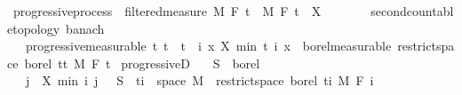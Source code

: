 \begin{isabellebody}
\endisatagproof
{\isafoldproof}%
%
\isadelimproof
%
\endisadelimproof
%
\isadelimdocument
%
\endisadelimdocument
%
\isatagdocument
%
\isamarkuptrue%
%
\endisatagdocument
{\isafolddocument}%
%
\isadelimdocument
%
\endisadelimdocument
{}\isamarkupfalse%
\ progressive{\isacharunderscore}{\kern0pt}process\ {\isacharequal}{\kern0pt}\ filtered{\isacharunderscore}{\kern0pt}measure\ M\ F\ t\ \ M\ F\ t\ \ X\ {\isacharcolon}{\kern0pt}{\isacharcolon}{\kern0pt}\ {\isachardoublequoteopen}{\isacharunderscore}{\kern0pt}\ {\isasymRightarrow}\ {\isacharunderscore}{\kern0pt}\ {\isasymRightarrow}\ {\isacharunderscore}{\kern0pt}\ {\isacharcolon}{\kern0pt}{\isacharcolon}{\kern0pt}\ {\isacharbraceleft}{\kern0pt}second{\isacharunderscore}{\kern0pt}countable{\isacharunderscore}{\kern0pt}topology{\isacharcomma}{\kern0pt}\ banach{\isacharbraceright}{\kern0pt}{\isachardoublequoteclose}\ {\isacharplus}{\kern0pt}\isanewline
\ \ \ progressive{\isacharbrackleft}{\kern0pt}measurable{\isacharbrackright}{\kern0pt}{\isacharcolon}{\kern0pt}\ {\isachardoublequoteopen}{\isasymAnd}t{\isachardot}{\kern0pt}\ t\ {\isasymle}\ t\ {\isasymLongrightarrow}\ {\isacharparenleft}{\kern0pt}{\isasymlambda}{\isacharparenleft}{\kern0pt}i{\isacharcomma}{\kern0pt}\ x{\isacharparenright}{\kern0pt}{\isachardot}{\kern0pt}\ X\ {\isacharparenleft}{\kern0pt}min\ t\ i{\isacharparenright}{\kern0pt}\ x{\isacharparenright}{\kern0pt}\ {\isasymin}\ borel{\isacharunderscore}{\kern0pt}measurable\ {\isacharparenleft}{\kern0pt}restrict{\isacharunderscore}{\kern0pt}space\ borel\ {\isacharbraceleft}{\kern0pt}tt{\isacharbraceright}{\kern0pt}\ {\isasymOtimes}\isactrlsub M\ F\ t{\isacharparenright}{\kern0pt}{\isachardoublequoteclose}\isanewline
{}\isanewline
\isanewline
{}\isamarkupfalse%
\ progressiveD{\isacharcolon}{\kern0pt}\isanewline
\ \ \ {\isachardoublequoteopen}S\ {\isasymin}\ borel{\isachardoublequoteclose}\isanewline
\ \ \ {\isachardoublequoteopen}{\isacharparenleft}{\kern0pt}{\isasymlambda}{\isacharparenleft}{\kern0pt}j{\isacharcomma}{\kern0pt}\ {\isasymxi}{\isacharparenright}{\kern0pt}{\isachardot}{\kern0pt}\ X\ {\isacharparenleft}{\kern0pt}min\ i\ j{\isacharparenright}{\kern0pt}\ {\isasymxi}{\isacharparenright}{\kern0pt}\ {\isacharminus}{\kern0pt}{\isacharbackquote}{\kern0pt}\ S\ {\isasyminter}\ {\isacharparenleft}{\kern0pt}{\isacharbraceleft}{\kern0pt}ti{\isacharbraceright}{\kern0pt}\ {\isasymtimes}\ space\ M{\isacharparenright}{\kern0pt}\ {\isasymin}\ {\isacharparenleft}{\kern0pt}restrict{\isacharunderscore}{\kern0pt}space\ borel\ {\isacharbraceleft}{\kern0pt}ti{\isacharbraceright}{\kern0pt}\ {\isasymOtimes}\isactrlsub M\ F\ i{\isacharparenright}{\kern0pt}{\isachardoublequoteclose}\ \isanewline

\end{isabellebody}
